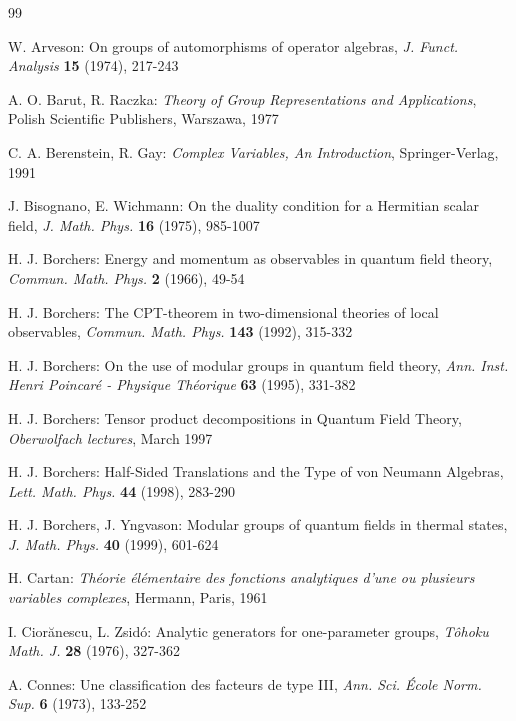 \documentclass[reqno]{amsart}
\theoremstyle{definition}
\theoremstyle{remark}
\numberwithin{equation}{section}
\theoremstyle{plain}
\begin{document}
\bigskip
\begin{thebibliography}{99}

 W. Arveson: On groups of automorphisms of operator
algebras, \emph{J. Funct. Analysis} \textbf{15} (1974), 217-243

 A. O. Barut, R. Raczka: \emph{Theory of Group
Representations and Applications}, Polish Scientific Publishers,
Warszawa, 1977
    
 C. A. Berenstein, R. Gay: \emph{Complex Variables,
An Introduction}, Springer-Verlag, 1991
    
 J. Bisognano, E. Wichmann: On the duality condition
for a Hermitian scalar field, \emph{J. Math. Phys.} \textbf{16}
(1975), 985-1007

 H. J. Borchers: Energy and momentum as observables
in quantum field theory, \emph{Commun. Math. Phys.} \textbf{2}
(1966), 49-54

 H. J. Borchers: The CPT-theorem in two-dimensional
theories of local observables, \emph{Commun. Math. Phys.}
\textbf{143} (1992), 315-332

 H. J. Borchers: On the use of modular groups in
quantum field theory, \emph{Ann. Inst. Henri Poincar\'e - Physique
Th\'eorique} \textbf{63} (1995), 331-382

 H. J. Borchers: Tensor product decompositions in
Quantum Field Theory, \emph{Oberwolfach lectures}, March 1997

 H. J. Borchers: Half-Sided Translations and the Type
of von Neumann Algebras, \emph{Lett. Math. Phys.} \textbf{44}
(1998), 283-290

 H. J. Borchers, J. Yngvason: Modular groups of
quantum fields in thermal states, \emph{J. Math. Phys.}
\textbf{40} (1999), 601-624

 H. Cartan: \emph{Th\'eorie \'el\'ementaire des
fonctions analytiques d'une ou plusieurs variables complexes},
Hermann, Paris, 1961

 I. Cior\u anescu, L. Zsid\'o: Analytic generators
for one-parameter groups, \emph{T\^ohoku Math. J.} \textbf{28}
(1976), 327-362

 A. Connes: Une classification des facteurs de
type III, \emph{Ann. Sci. \'Ecole Norm. Sup.} \textbf{6} (1973),
133-252


\end{thebibliography}
\end{document}
